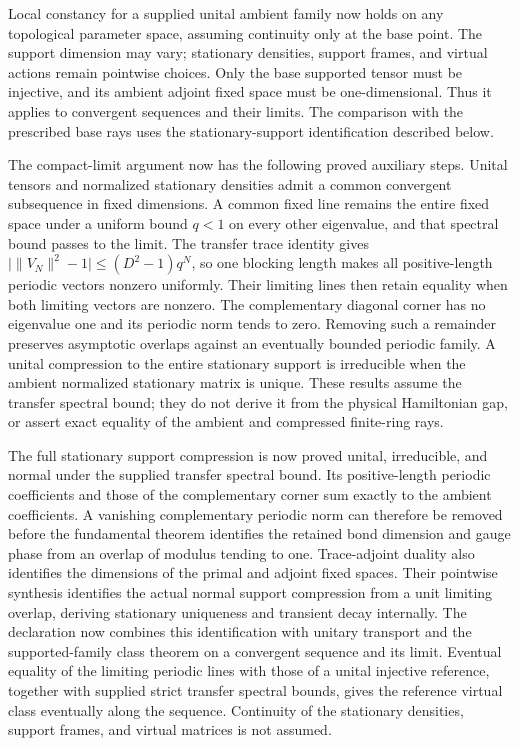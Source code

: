 \documentclass{article}
\begin{document}
Local constancy for a supplied unital ambient family now holds on any
topological parameter space, assuming continuity only at the base point.
The support dimension may vary; stationary densities, support frames, and
virtual actions remain pointwise choices. Only the base supported tensor
must be injective, and its ambient adjoint fixed space must be
one-dimensional. Thus it applies to convergent sequences and their limits.
The comparison with the prescribed base rays uses the stationary-support
identification described below.

The compact-limit argument now has the following proved auxiliary steps.
Unital tensors and normalized stationary densities admit a common convergent
subsequence in fixed dimensions. A common fixed line remains the entire
fixed space under a uniform bound $q<1$ on every other eigenvalue, and that
spectral bound passes to the limit. The transfer trace identity gives
$\bigl|\|V_N\|^2-1\bigr|\leq(D^2-1)q^N$, so one blocking length makes all
positive-length periodic vectors nonzero uniformly. Their limiting lines
then retain equality when both limiting vectors are nonzero. The
complementary diagonal corner has no eigenvalue one and its periodic norm
tends to zero. Removing such a remainder preserves asymptotic overlaps
against an eventually bounded periodic family. A unital compression to the
entire stationary support is irreducible when the ambient normalized
stationary matrix is unique. These results assume the transfer spectral
bound; they do not derive it from the physical Hamiltonian gap, or assert
exact equality of the ambient and compressed finite-ring rays.

The full stationary support compression is now proved unital, irreducible,
and normal under the supplied transfer spectral bound. Its positive-length
periodic coefficients and those of the complementary corner sum exactly to
the ambient coefficients. A vanishing complementary periodic norm can
therefore be removed before the fundamental theorem identifies the retained
bond dimension and gauge phase from an overlap of modulus tending to one.
Trace-adjoint duality also identifies the dimensions of the primal and
adjoint fixed spaces. Their pointwise synthesis identifies the actual normal
support compression from a unit limiting overlap, deriving stationary
uniqueness and transient decay internally. The declaration
now combines this identification with unitary transport and the supported-family
class theorem on a convergent sequence and its limit. Eventual equality of the
limiting periodic lines with those of a unital injective reference, together
with supplied strict transfer spectral bounds, gives the reference virtual
class eventually along the sequence. Continuity of the stationary densities,
support frames, and virtual matrices is not assumed.
\end{document}
